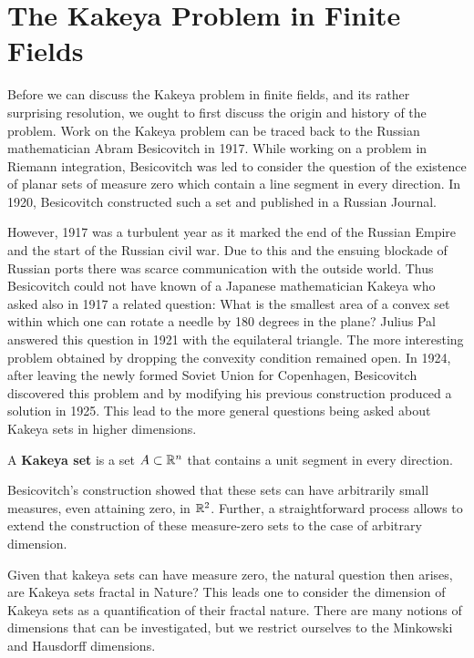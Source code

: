 \chapter{The Kakeya Problem in Finite Fields \label{chap:kakeya}}
Before we can discuss the Kakeya problem in finite fields, and its rather surprising resolution, we ought to first discuss the origin and history of the problem. 
Work on the Kakeya problem can be traced back to the Russian mathematician Abram Besicovitch in 1917. While working on a problem in Riemann integration, Besicovitch was led to consider the question of the existence of planar sets of measure zero which contain a line segment in every direction. In 1920, Besicovitch constructed such a set and published in a Russian Journal.

However, 1917 was a turbulent year as it marked the end of
the Russian Empire and the start of the Russian civil war. Due to this and the ensuing blockade of Russian ports there was scarce communication with the outside world.
Thus Besicovitch could not have known of a Japanese mathematician Kakeya who asked also in 1917 a related question: What is the smallest area of a convex set within which
one can rotate a needle by 180 degrees in the plane? Julius Pal answered this question in 1921 with the equilateral triangle.\cite{pal1920elementares} The 
more interesting problem obtained by dropping the convexity condition remained open. In 1924, after leaving the newly formed Soviet Union for Copenhagen, Besicovitch discovered this
problem and by modifying his previous construction produced a solution in 1925. This lead to the more general questions being asked about Kakeya sets in higher dimensions.
\begin{definition}
    A \textbf{Kakeya set} is a set $A \subset \mathbb R^n$ that contains a unit segment in every direction.
\end{definition}
Besicovitch's construction showed that these sets can have arbitrarily small measures, even attaining zero, in $\mathbb R^2$. Further, a straightforward process allows to extend the construction of these measure-zero sets to the case of arbitrary dimension.

Given that kakeya sets can have measure zero, the natural question then arises, are Kakeya sets fractal in Nature? This leads one to consider the dimension of Kakeya sets as a quantification of their fractal nature. There are many notions of dimensions that can be investigated, but we restrict ourselves to the Minkowski and Hausdorff dimensions.


